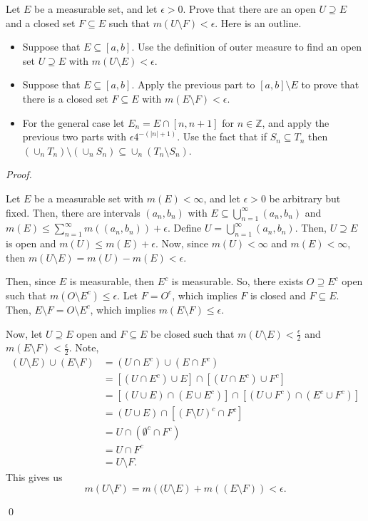 \documentclass[12pt]{article}
\newenvironment{problem}[2][Problem]{\begin{trivlist}
\item[\hskip \labelsep {\bfseries #1}\hskip \labelsep {\bfseries
#2.}]}{\end{trivlist}}
\newenvironment{sol}
    {\emph{Proof.}
    }
    {
    \qed
    }
\begin{document}
\begin{problem}{39}
  Let $E$ be a measurable set, and let $\epsilon > 0$. Prove that there are an open $U \supseteq E$ and a closed set $F \subseteq E$ such that $m(U \setminus F) < \epsilon$. Here is an outline.

  \begin{itemize}
    \item[(a)] Suppose that $E \subseteq [a,b]$. Use the definition of outer measure to find an open set $U \supseteq E$ with $m(U \setminus E) < \epsilon$.
    \item[(b)] Suppose that $E \subseteq [a,b]$. Apply the previous part to $[a,b] \setminus E$ to prove that there is a closed set $F \subseteq E$ with $m(E \setminus F) < \epsilon$.
    \item[(c)] For the general case let $E_n = E \cap [n,n+1]$ for $n \in \mathbb{Z}$, and apply the previous two parts with $\epsilon4^{-(|n|+1)}$. Use the fact that if $S_n \subseteq T_n$ then $(\cup_nT_n) \setminus (\cup_nS_n) \subseteq \cup_n(T_n \setminus S_n)$.
  \end{itemize}
\end{problem}
\begin{sol}
  Let $E$ be a measurable set with $m(E) < \infty$, and let $\epsilon > 0$ be arbitrary but fixed. Then, there are intervals $(a_n,b_n)$ with $E \subseteq \bigcup_{n = 1}^{\infty}(a_n,b_n)$ and $m(E) \leq \sum_{n = 1}^{\infty}m((a_n,b_n)) + \epsilon$. Define $U = \bigcup_{n = 1}^{\infty}(a_n,b_n)$. Then, $U \supseteq E$ is open and $m(U) \leq m(E) + \epsilon$. Now, since $m(U) < \infty$ and $m(E) < \infty$, then $m(U \setminus E) = m(U) - m(E) < \epsilon$.
  
  Then, since $E$ is measurable, then $E^c$ is measurable. So, there exists $O \supseteq E^c$ open such that $m(O \setminus E^c) \leq \epsilon$. Let $F = O^c$, which implies $F$ is closed and $F \subseteq E$. Then, $E \setminus F = O \setminus E^c$, which implies $m(E \setminus F) \leq \epsilon$. 

  Now, let $U \supseteq E$ open and $F \subseteq E$ be closed such that $m(U \setminus E) < \frac{\epsilon}{2}$ and $m(E \setminus F) < \frac{\epsilon}{2}$. Note, 
  \begin{align*}
    (U \setminus E) \cup (E \setminus F) &= (U \cap E^c) \cup (E \cap F^c) \\
    &= \left[(U \cap E^c) \cup E\right] \cap \left[(U \cap E^c) \cup F^c\right] \\
    &= \left[(U \cup E) \cap (E \cup E^c)\right] \cap \left[(U \cup F^c) \cap (E^c \cup F^c)\right] \\
    &= (U \cup E) \cap \left[(F \setminus U)^c \cap F^c\right] \\
    &= U \cap (\emptyset^c \cap F^c) \\
    &= U \cap F^c \\ &= U \setminus F.
  \end{align*}
  This gives us $$m(U \setminus F) = m\left( (U \setminus E \right) + m\left( (E \setminus F) \right) < \epsilon.$$
\end{sol}
\end{document}
